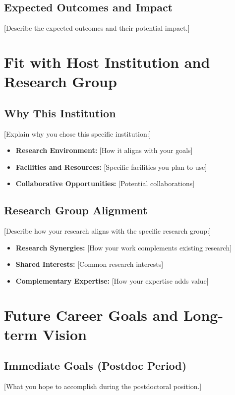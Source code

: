 \documentclass[11pt,a4paper]{article}
\begin{document}
\subsection{Expected Outcomes and Impact}
[Describe the expected outcomes and their potential impact.]

\section{Fit with Host Institution and Research Group}
\subsection{Why This Institution}
[Explain why you chose this specific institution:]

\begin{itemize}
    \item \textbf{Research Environment:} [How it aligns with your goals]
    \item \textbf{Facilities and Resources:} [Specific facilities you plan to use]
    \item \textbf{Collaborative Opportunities:} [Potential collaborations]
\end{itemize}

\subsection{Research Group Alignment}
[Describe how your research aligns with the specific research group:]

\begin{itemize}
    \item \textbf{Research Synergies:} [How your work complements existing research]
    \item \textbf{Shared Interests:} [Common research interests]
    \item \textbf{Complementary Expertise:} [How your expertise adds value]
\end{itemize}

\section{Future Career Goals and Long-term Vision}
\subsection{Immediate Goals (Postdoc Period)}
[What you hope to accomplish during the postdoctoral position.]
\end{document}
